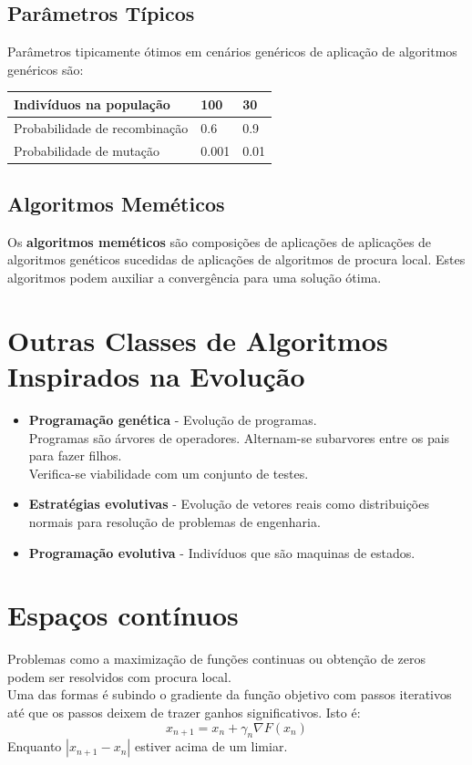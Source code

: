 \documentclass[]{report}
\begin{document}
\subsection{Parâmetros Típicos}
Parâmetros tipicamente ótimos em cenários genéricos de aplicação de algoritmos genéricos são:
\begin{table}[ht]
	\begin{tabular}{l|l|l}
		\textbf{Indivíduos na população}& \textbf{100}	& \textbf{30}   \\\hline
		Probabilidade de recombinação 	& 0.6			& 0.9  \\\hline
		Probabilidade de mutação      	& 0.001			& 0.01
	\end{tabular}
\end{table}
\subsection{Algoritmos Meméticos}
Os \textbf{algoritmos meméticos} são composições de aplicações de aplicações de algoritmos genéticos sucedidas de aplicações de algoritmos de procura local.
Estes algoritmos podem auxiliar a convergência para uma solução ótima.
\section{Outras Classes de Algoritmos Inspirados na Evolução}
\begin{itemize}
	\item \textbf{Programação genética} - Evolução de programas.\\
	Programas são árvores de operadores. Alternam-se subarvores entre os pais para fazer filhos.\\ Verifica-se viabilidade com um conjunto de testes.
	\item \textbf{Estratégias evolutivas} - Evolução de vetores reais como distribuições normais para resolução de problemas de engenharia.
	\item \textbf{Programação evolutiva} - Indivíduos que são maquinas de estados.
\end{itemize}
\clearpage
\section{Espaços contínuos}
Problemas como a maximização de funções continuas ou obtenção de zeros podem ser resolvidos com procura local.\\
Uma das formas é subindo o gradiente da função objetivo com passos iterativos até que os passos deixem de trazer ganhos significativos. Isto é:
$$x_{n+1} = x_n + \gamma_n \nabla F(x_n)$$
Enquanto $|x_{n+1} - x_n|$ estiver acima de um limiar.
\end{document}
